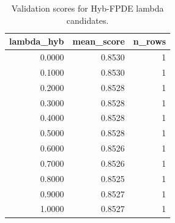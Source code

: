 \begin{table}[t]
\caption{Validation scores for Hyb-FPDE lambda candidates.}
\label{tab:lambda_distribution_computed}
\centering
\begin{tabular}{rrr}
\toprule
lambda\_hyb & mean\_score & n\_rows \\
\midrule
0.0000 & 0.8530 & 1 \\
0.1000 & 0.8530 & 1 \\
0.2000 & 0.8528 & 1 \\
0.3000 & 0.8528 & 1 \\
0.4000 & 0.8528 & 1 \\
0.5000 & 0.8528 & 1 \\
0.6000 & 0.8526 & 1 \\
0.7000 & 0.8526 & 1 \\
0.8000 & 0.8525 & 1 \\
0.9000 & 0.8527 & 1 \\
1.0000 & 0.8527 & 1 \\
\bottomrule
\end{tabular}

\end{table}
